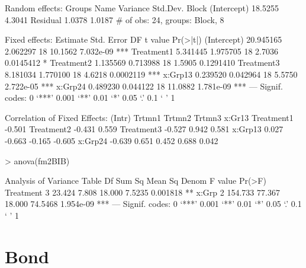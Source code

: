 \documentclass[12pt]{article}
\begin{document}
\begin{Schunk}
\begin{Soutput}
Random effects:
 Groups   Name        Variance Std.Dev.
 Block    (Intercept) 18.5255  4.3041  
 Residual              1.0378  1.0187  
# of obs: 24, groups: Block, 8

Fixed effects:
             Estimate Std. Error DF t value  Pr(>|t|)    
(Intercept) 20.945165   2.062297 18 10.1562 7.032e-09 ***
Treatment1   5.341445   1.975705 18  2.7036 0.0145412 *  
Treatment2   1.135569   0.713988 18  1.5905 0.1291410    
Treatment3   8.181034   1.770100 18  4.6218 0.0002119 ***
x:Grp13      0.239520   0.042964 18  5.5750 2.722e-05 ***
x:Grp24      0.489230   0.044122 18 11.0882 1.781e-09 ***
---
Signif. codes:  0 `***' 0.001 `**' 0.01 `*' 0.05 `.' 0.1 ` ' 1 

Correlation of Fixed Effects:
           (Intr) Trtmn1 Trtmn2 Trtmn3 x:Gr13
Treatment1 -0.501                            
Treatment2 -0.431  0.559                     
Treatment3 -0.527  0.942  0.581              
x:Grp13     0.027 -0.663 -0.165 -0.605       
x:Grp24    -0.639  0.651  0.452  0.688  0.042
\end{Soutput}
\begin{Sinput}
> anova(fm2BIB)
\end{Sinput}
\begin{Soutput}
Analysis of Variance Table
          Df  Sum Sq Mean Sq   Denom F value    Pr(>F)    
Treatment  3  23.424   7.808  18.000  7.5235  0.001818 ** 
x:Grp      2 154.733  77.367  18.000 74.5468 1.954e-09 ***
---
Signif. codes:  0 `***' 0.001 `**' 0.01 `*' 0.05 `.' 0.1 ` ' 1 
\end{Soutput}
\end{Schunk}


\section{Bond}
\label{sec:Bond}
\end{document}
